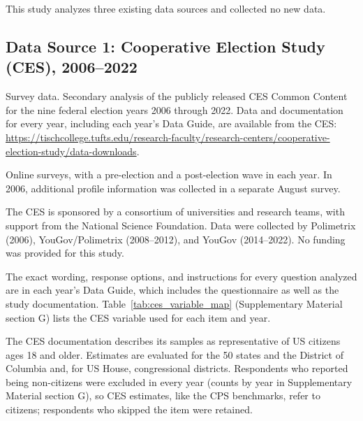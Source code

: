 \documentclass[12pt]{article}
\begin{document}
This study analyzes three existing data sources and collected no new data.

\subsection*{Data Source 1: Cooperative Election Study (CES), 2006--2022}

\begin{description}[style=unboxed, leftmargin=0pt, font=\normalfont\bfseries]
\item[Data Source:] Survey data. Secondary analysis of the publicly released CES Common Content for the nine federal election years 2006 through 2022. Data and documentation for every year, including each year's Data Guide, are available from the CES: \url{https://tischcollege.tufts.edu/research-faculty/research-centers/cooperative-election-study/data-downloads}.

\item[Data Collection Strategy:] Online surveys, with a pre-election and a post-election wave in each year. In 2006, additional profile information was collected in a separate August survey.

\item[Research Sponsor and Conductor:] The CES is sponsored by a consortium of universities and research teams, with support from the National Science Foundation. Data were collected by Polimetrix (2006), YouGov/Polimetrix (2008--2012), and YouGov (2014--2022). No funding was provided for this study.

\item[Measurement Tools/Instruments:] The exact wording, response options, and instructions for every question analyzed are in each year's Data Guide, which includes the questionnaire as well as the study documentation. Table~\ref{tab:ces_variable_map} (Supplementary Material section G) lists the CES variable used for each item and year.

\item[Population Under Study:] The CES documentation describes its samples as representative of US citizens ages 18 and older. Estimates are evaluated for the 50 states and the District of Columbia and, for US House, congressional districts. Respondents who reported being non-citizens were excluded in every year (counts by year in Supplementary Material section G), so CES estimates, like the CPS benchmarks, refer to citizens; respondents who skipped the item were retained.


\end{description}
\end{document}
